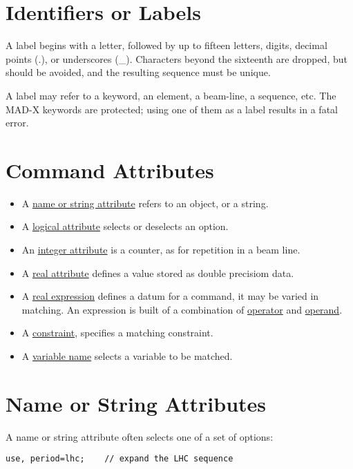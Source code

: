%
\section{Identifiers or Labels}
\label{sec:label}
A label begins with a letter, followed by up to fifteen letters, digits,
decimal points (.), or underscores (\_). Characters beyond the sixteenth
are dropped, but should be avoided, and the resulting sequence must be
unique. 

A label may refer to a keyword, an element, a beam-line, a sequence,
etc.   The MAD-X keywords are protected; using one of them as a label
results in a fatal error.  


%
\section{Command Attributes}
\label{sec:attribute}

\begin{itemize}
	\item A \href{name.html}{name or string attribute} refers to an object, or a string. 
	\item A \href{logical.html}{logical attribute} selects or deselects an option. 
	\item An \href{integer.html}{integer attribute} is a counter, as for repetition in a beam line. 
        \item A \href{real.html}{real attribute} defines a value stored
          as double precisiom data.  
	\item A \href{expression.html}{real expression} defines a datum
          for a command, it may be varied in matching. An expression is
          built of a combination of
          \href{expression.html#operator}{operator} and
          \href{expression.html#operand}{operand}. 
	\item A \href{constraint.html}{constraint}, specifies a matching constraint. 
	\item A \href{variable.html}{variable name} selects a variable to be matched. 
\end{itemize}


%
\section{Name or String Attributes}
\label{sec:name}
A name or string attribute often selects one of a set of options: 
\begin{verbatim}
use, period=lhc;    // expand the LHC sequence
\end{verbatim} 

